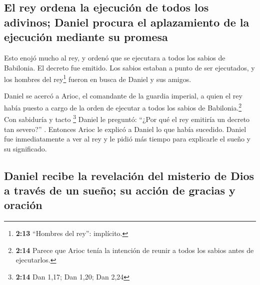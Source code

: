 \hypertarget{el-rey-ordena-la-ejecuciuxf3n-de-todos-los-adivinos-daniel-procura-el-aplazamiento-de-la-ejecuciuxf3n-mediante-su-promesa}{%
\subsection{El rey ordena la ejecución de todos los adivinos; Daniel
procura el aplazamiento de la ejecución mediante su
promesa}\label{el-rey-ordena-la-ejecuciuxf3n-de-todos-los-adivinos-daniel-procura-el-aplazamiento-de-la-ejecuciuxf3n-mediante-su-promesa}}

 Esto enojó mucho al rey, y ordenó que se ejecutara a
todos los sabios de Babilonia.  El decreto fue emitido.
Los sabios estaban a punto de ser ejecutados, y los hombres del
rey\footnote{\textbf{2:13} ``Hombres del rey'': implícito.} fueron en
busca de Daniel y sus amigos.

 Daniel se acercó a Arioc, el comandante de la guardia
imperial, a quien el rey había puesto a cargo de la orden de ejecutar a
todos los sabios de Babilonia.\footnote{\textbf{2:14} Parece que Arioc
  tenía la intención de reunir a todos los sabios antes de ejecutarlos.}
Con sabiduría y tacto \footnote{\textbf{2:14} Dan 1,17; Dan 1,20; Dan
  2,24}  Daniel le preguntó: ``¿Por qué el rey emitiría
un decreto tan severo?'' . Entonces Arioc le explicó a Daniel lo que
había sucedido.  Daniel fue inmediatamente a ver al rey y
le pidió más tiempo para explicarle el sueño y su significado.

\hypertarget{daniel-recibe-la-revelaciuxf3n-del-misterio-de-dios-a-travuxe9s-de-un-sueuxf1o-su-acciuxf3n-de-gracias-y-oraciuxf3n}{%
\subsection{Daniel recibe la revelación del misterio de Dios a través de
un sueño; su acción de gracias y
oración}\label{daniel-recibe-la-revelaciuxf3n-del-misterio-de-dios-a-travuxe9s-de-un-sueuxf1o-su-acciuxf3n-de-gracias-y-oraciuxf3n}}


